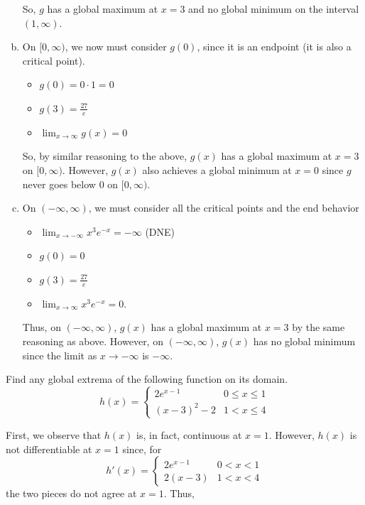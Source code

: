 \documentclass[11pt]{exam}
\begin{document}
\begin{questions}
\begin{solution}
\begin{enumerate}[(a)]
    So, \(g\) has a global maximum at \(x=3\) and no global minimum on
    the interval \((1,\infty)\).
  \item On \([0,\infty)\), we now must consider \(g(0)\), since it is
    an endpoint (it is also a critical point).
    \begin{itemize}
    \item \(g(0) = 0 \cdot 1 = 0\)
    \item \(g(3) = \frac{27}{e}\)
    \item \(\lim_{x \to \infty} g(x) = 0\)
    \end{itemize}
    So, by similar reasoning to the above, \(g(x)\) has a global
    maximum at \(x=3\) on \([0,\infty)\). However, \(g(x)\) also achieves a global
    minimum at \(x=0\) since \(g\) never goes below \(0\) on \([0,\infty)\).
  \item On \((-\infty,\infty)\), we must consider all the critical
    points and the end behavior 
    \begin{itemize}
    \item \(\lim_{x \to -\infty} x^3 e^{-x} = -\infty\) (DNE)
    \item \(g(0) = 0\)
    \item \(g(3) = \frac{27}{e}\)
    \item \(\lim_{x \to \infty} x^3 e^{-x} = 0\).
    \end{itemize}
    Thus, on \((-\infty,\infty)\), \(g(x)\) has a global maximum at
    \(x=3\) by the same reasoning as above. However, on
    \((-\infty,\infty)\), \(g(x)\) has no global minimum since the
    limit as \(x \to -\infty\) is \(-\infty\).
  \end{enumerate}
\end{solution}
\question Find any global extrema of the following function on its domain.
$$h(x) = \left\{
\begin{array}{ll}
      2e^{x-1}& 0\leq x\leq 1 \\
      (x-3)^2-2 & 1<x\leq 4 
\end{array} 
\right.
$$
\begin{solution}
  First, we observe that \(h(x)\) is, in fact, continuous at
  \(x=1\). However, \(h(x)\) is not differentiable at \(x=1\) since, for \[
    h'(x) =
    \begin{cases}
      2e^{x-1} & 0 < x < 1\\
      2(x-3) & 1 < x < 4
    \end{cases}
  \]
  the two pieces do not agree at \(x=1\). Thus, 
  \begin{itemize}

\end{itemize}
\end{solution}
\end{questions}
\end{document}
